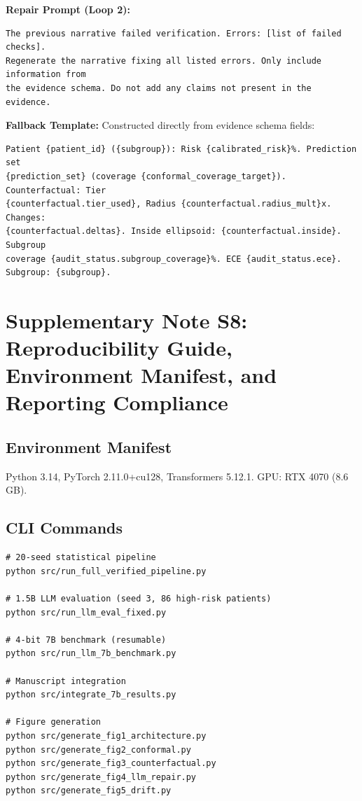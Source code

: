 \documentclass[11pt,a4paper]{article}
\theoremstyle{plain}
\begin{document}
\textbf{Repair Prompt (Loop 2):}
{\footnotesize
\begin{verbatim}
The previous narrative failed verification. Errors: [list of failed checks].
Regenerate the narrative fixing all listed errors. Only include information from
the evidence schema. Do not add any claims not present in the evidence.
\end{verbatim}
}

\textbf{Fallback Template:} Constructed directly from evidence schema fields:
{\footnotesize
\begin{verbatim}
Patient {patient_id} ({subgroup}): Risk {calibrated_risk}%. Prediction set
{prediction_set} (coverage {conformal_coverage_target}). Counterfactual: Tier
{counterfactual.tier_used}, Radius {counterfactual.radius_mult}x. Changes:
{counterfactual.deltas}. Inside ellipsoid: {counterfactual.inside}. Subgroup
coverage {audit_status.subgroup_coverage}%. ECE {audit_status.ece}. Subgroup: {subgroup}.
\end{verbatim}

\section{Supplementary Note S8: Reproducibility Guide, Environment Manifest, and Reporting Compliance}
\label{sec:repro}

\subsection{Environment Manifest}

Python 3.14, PyTorch 2.11.0+cu128, Transformers 5.12.1. GPU: RTX 4070 (8.6 GB).

\subsection{CLI Commands}

\begin{verbatim}
# 20-seed statistical pipeline
python src/run_full_verified_pipeline.py

# 1.5B LLM evaluation (seed 3, 86 high-risk patients)
python src/run_llm_eval_fixed.py

# 4-bit 7B benchmark (resumable)
python src/run_llm_7b_benchmark.py

# Manuscript integration
python src/integrate_7b_results.py

# Figure generation
python src/generate_fig1_architecture.py
python src/generate_fig2_conformal.py
python src/generate_fig3_counterfactual.py
python src/generate_fig4_llm_repair.py
python src/generate_fig5_drift.py
\end{verbatim}
}
\end{document}
